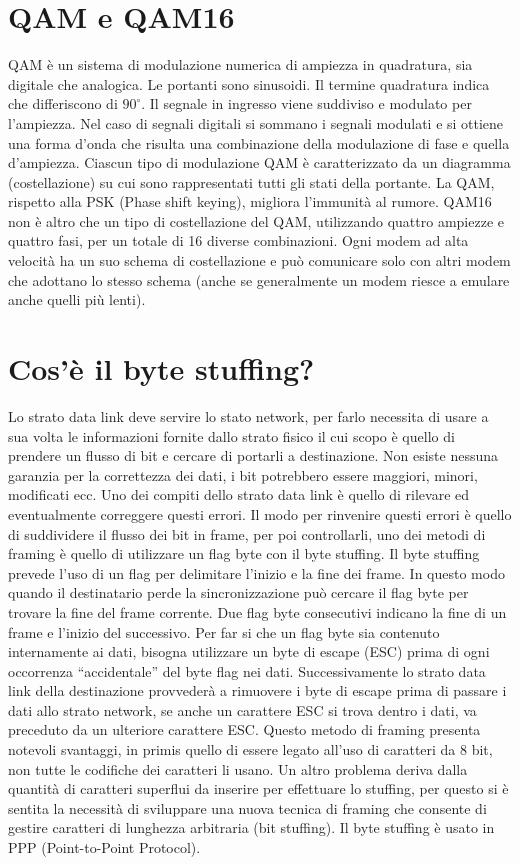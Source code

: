  
\section{QAM e QAM16}

QAM è un sistema di modulazione numerica di ampiezza in quadratura, sia digitale che analogica. 
Le portanti sono sinusoidi. Il termine quadratura indica che differiscono di $90^{\circ}$.
Il segnale in ingresso viene suddiviso e modulato per l’ampiezza. Nel caso di segnali digitali si sommano i segnali modulati e si ottiene una forma d’onda che risulta una combinazione della modulazione di fase e quella d’ampiezza.
Ciascun tipo di modulazione QAM è caratterizzato da un diagramma (costellazione) su cui sono rappresentati tutti gli stati della portante.
La QAM, rispetto alla PSK (Phase shift keying), migliora l’immunità al rumore.
QAM16 non è altro che un tipo di costellazione del QAM, utilizzando quattro ampiezze e quattro fasi, per un totale di 16 diverse combinazioni. Ogni modem ad alta velocità ha un suo schema di costellazione e può comunicare solo con altri modem che adottano lo stesso schema (anche se generalmente un modem riesce a emulare anche quelli più lenti).

 
\section{Cos’è il byte stuffing?}

Lo strato data link deve servire lo stato network, per farlo necessita di usare a sua volta le informazioni fornite dallo strato fisico il cui scopo è quello di prendere un flusso di bit e cercare di portarli a destinazione.
Non esiste nessuna garanzia per la correttezza dei dati, i bit potrebbero essere maggiori, minori, modificati ecc. Uno dei compiti dello strato data link è quello di rilevare ed eventualmente correggere questi errori.
Il modo per rinvenire questi errori è quello di suddividere il flusso dei bit in frame, per poi controllarli, uno dei metodi di framing è quello di utilizzare un flag byte con il byte stuffing.
Il byte stuffing prevede l’uso di un flag per delimitare l’inizio e la fine dei frame. In questo modo quando il destinatario perde la sincronizzazione può cercare il flag byte per trovare la fine del frame corrente. Due flag byte consecutivi indicano la fine di un frame e l’inizio del successivo.
Per far si che un flag byte sia contenuto internamente ai dati, bisogna utilizzare un byte di escape (ESC) prima di ogni occorrenza “accidentale” del byte flag nei dati. Successivamente lo strato data link della destinazione provvederà a rimuovere i byte di escape prima di passare i dati allo strato network, se anche un carattere ESC si trova dentro i dati, va preceduto da un ulteriore carattere ESC.
Questo metodo di framing presenta notevoli svantaggi, in primis quello di essere legato all’uso di caratteri da 8 bit, non tutte le codifiche dei caratteri li usano. Un altro problema deriva dalla quantità di caratteri superflui da inserire per effettuare lo stuffing, per questo si è sentita la necessità di sviluppare una nuova tecnica di framing che consente di gestire caratteri di lunghezza arbitraria (bit stuffing).
Il byte stuffing è usato in PPP (Point-to-Point Protocol).
 

